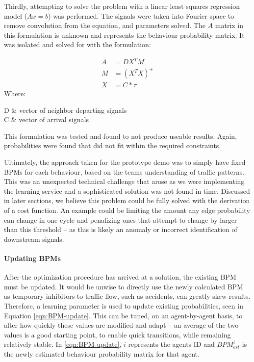 \documentclass{report}
\makeatletter
\newenvironment{conditions*}
  {\par\vspace{\abovedisplayskip}\noindent\begin{tabular}{>{$}l<{$} @{${}={}$} l}}
  {\end{tabular}\par\vspace{\belowdisplayskip}}
\makeatother
\begin{document}
Thirdly, attempting to solve the problem with a linear least squares regression model ($Ax=b$) was performed. 
The signals were taken into Fourier space to remove convolution from the equation, and parameters solved. 
The $A$ matrix in this formulation is unknown and represents the behaviour probability matrix. 
It was isolated and solved for with the formulation:

\begin{align}
	A& = DX^{T}M \\
	M& = (X^{T}X)^{+} \\
	X& = C \ast \tau
\end{align}
Where:
\begin{conditions*}
D & vector of neighbor departing signals \\
C & vector of arrival signals
\end{conditions*}

This formulation was tested and found to not produce useable results. 
Again, probabilities were found that did not fit within the required constraints.

Ultimately, the approach taken for the prototype demo was to simply have fixed BPMs for each behaviour, based on the teams understanding of traffic patterns. 
This was an unexpected technical challenge that arose as we were implementing the learning service and a sophisticated solution was not found in time. 
Discussed in later sections, we believe this problem could be fully solved with the derivation of a cost function. 
An example could be limiting the amount any edge probability can change in one cycle and penalizing ones that attempt to change by larger than this threshold – as this is likely an anomaly or incorrect identification of downstream signals.

\paragraph{Updating BPMs}
After the optimization procedure has arrived at a solution, the existing BPM must be updated. 
It would be unwise to directly use the newly calculated BPM as temporary inhibitors to traffic flow, such as accidents, can greatly skew results. 
Therefore, a learning parameter is used to update existing probabilities, seen in Equation \eqref{eqn:BPM-update}. 
This can be tuned, on an agent-by-agent basis, to alter how quickly these values are modified and adapt – an average of the two values is a good starting point, to enable quick transitions, while remaining relatively stable. 
In \eqref{eqn:BPM-update}, $i$ represents the agents ID and $BPM_{est}^{i}$ is the newly estimated behaviour probability matrix for that agent.
\end{document}
